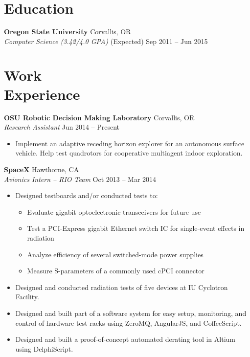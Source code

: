 \documentclass[10pt,letterpaper,margin]{res}
\begin{document}
\begin{resume}

\section{Education}

{\bf Oregon State University} \hfill {\color{lightgray} Corvallis, OR} \\
{\it Computer Science (3.42/4.0 GPA)} \hfill {\color{lightgray} (Expected) Sep 2011 -- Jun 2015}\vspace{0.0em}


\section{Work \\ Experience}

{\bf OSU Robotic Decision Making Laboratory} \hfill {\color{lightgray} Corvallis, OR} \\
{\it Research Assistant} \hfill {\color{lightgray} Jun 2014 -- Present}\vspace{0.0em}

\begin{itemize}
	\item Implement an adaptive receding horizon explorer for an autonomous
		surface vehicle. Help test quadrotors for cooperative multiagent indoor
		exploration.
\end{itemize}


{\bf SpaceX} \hfill {\color{lightgray} Hawthorne, CA} \\
{\it Avionics Intern -- RIO Team} \hfill {\color{lightgray} Oct 2013 -- Mar 2014}\vspace{0.0em}

\begin{itemize}
	\item Designed testboards and/or conducted tests to:
		\begin{itemize}
			\item Evaluate gigabit optoelectronic transceivers for future use
			\item Test a PCI-Express gigabit Ethernet switch IC for
				single-event effects in radiation
			\item Analyze efficiency of several switched-mode power supplies
			\item Measure S-parameters of a commonly used cPCI connector
		\end{itemize}
	\item Designed and conducted radiation tests of five devices at IU
		Cyclotron Facility.
	\item Designed and built part of a software system for easy setup,
		monitoring, and control of hardware test racks using ZeroMQ, AngularJS,
		and CoffeeScript.
	\item Designed and built a proof-of-concept automated derating tool in
		Altium using DelphiScript.
\end{itemize}



\end{resume}
\end{document}
